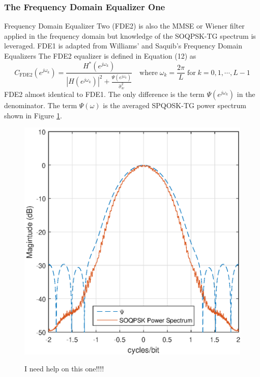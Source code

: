 \subsubsection{The Frequency Domain Equalizer One}
Frequency Domain Equalizer Two (FDE2) is also the MMSE or Wiener filter applied in the frequency domain but knowledge of the SOQPSK-TG spectrum is leveraged.
FDE1 is adapted from Williams' and Saquib's Frequency Domain Equalizers \cite[eq. (12)]{williams2013linear}
The FDE2 equalizer is defined in Equation (12) as
\begin{equation}
C_\text{FDE2}(e^{j\omega_k}) = \frac{H^\ast(e^{j\omega_k})}  {|H(e^{j\omega_k})|^2  +  \frac{\Psi(e^{j\omega_k})}{\hat{\sigma}^2_w}} \quad
\text{where} \;
\omega_k = \frac{2\pi}{L} \;
\text{for} \;
k=0,1,\cdots,L-1
\label{eq:FDE2}
\end{equation}
FDE2 almost identical to FDE1.
The only difference is the term $\Psi(e^{j\omega_k})$ in the denominator. 
The term $\Psi(\omega)$ is the averaged SPQOSK-TG power spectrum shown in Figure \ref{fig:SOQPSK_spectrum}.
\begin{figure}
	\caption{I need help on this one!!!! }
	\centering\includegraphics[width=5in]{figures/eq_equations/FDE2_spectrum_PSI.eps}
	\label{fig:SOQPSK_spectrum}
\end{figure}
